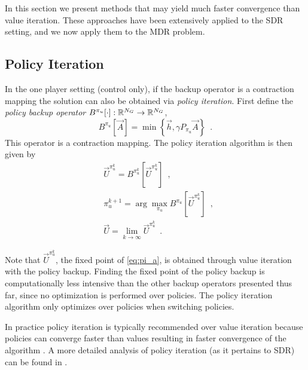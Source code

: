 In this section we present methods that may yield much faster convergence than value iteration. These approaches have been extensively applied to the SDR setting, and we now apply them to the MDR problem. 

\subsection{Policy Iteration}

In the one player setting (control only), if the backup operator is a contraction mapping the solution can also be obtained via \emph{policy iteration}. First define the \emph{policy backup operator} $B^{\pi_u}[\cdot]: \mathbb{R}^{N_G} \rightarrow \mathbb{R}^{N_G}$, 
%
\begin{equation} \label{eq:backup_policy}
B^{\pi_u}[\vec{A}] = \min\left\{ \vec{h}, \gamma P_{\pi_u} \vec{A} \right \} \enspace.
\end{equation}%
\noindent This operator is a contraction mapping. The policy iteration algorithm is then given by
%
\begin{subequations}\label{eq:pi}
\begin{align}
&\vec{U}^{\pi_u^k} = B^{\pi_u^k}[\vec{U}^{\pi_u^k}] \label{eq:pi_a} \enspace,\\
&\pi_u^{k+1} = \arg\underset{\pi_u}{\max}B^{\pi_u}[\vec{U}^{\pi_u^k}] \enspace,\\ 
&\vec{U} = \lim_{k\rightarrow \infty} \vec{U}^{\pi_u^k}\enspace.
\end{align}
\end{subequations}

Note that ${\vec{U}^{\pi_u^k}}$, the fixed point of \eqref{eq:pi_a}, is obtained through value iteration with the policy backup. Finding the fixed point of the policy backup is computationally less intensive than the other backup operators presented thus far, since no optimization is performed over policies. The policy iteration algorithm only optimizes over policies when switching policies.  

In practice policy iteration is typically recommended over value iteration because policies can converge faster than values resulting in faster convergence of the algorithm \cite{Russell2003}. A more detailed analysis of policy iteration (as it pertains to SDR) can be found in \cite{Bokanowski2009,Howard1964, Puterman1979}. 

